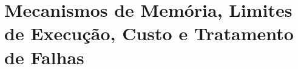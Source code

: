 \documentclass[12pt,a4paper]{article}
\newcommand{\code}[1]{\nolinkurl{#1}}
\begin{document}


\section{Mecanismos de Memória, Limites de Execução, Custo e Tratamento de Falhas}
\label{sec:memoria-limites-falhas}

\end{document}
